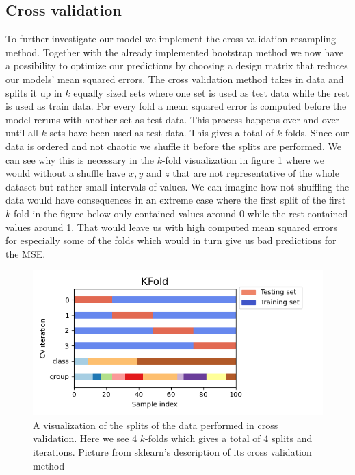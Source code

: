 \documentclass[12pt]{article}
\begin{document}
\subsection{Cross validation}
To further investigate our model we implement the cross validation resampling method. Together with the already implemented bootstrap method we now have a possibility to optimize our predictions by choosing a design matrix that reduces our models' mean squared errors. The cross validation method takes in data and splits it up in $k$ equally sized sets where one set is used as test data while the rest is used as train data. For every fold a mean squared error is computed before the model reruns with another set as test data. This process happens over and over until all $k$ sets have been used as test data. This gives a total of $k$ folds. Since our data is ordered and not chaotic we shuffle it before the splits are performed. We can see why this is necessary in the $k$-fold visualization in figure \ref{fig:k_fold} where we would without a shuffle have $x,y$ and $z$ that are not representative of the whole dataset but rather small intervals of values. We can imagine how not shuffling the data would have consequences in an extreme case where the first split of the first $k$-fold in the figure below only contained values around 0 while the rest contained values around 1. That would leave us with high computed mean squared errors for especially some of the folds which would in turn give us bad predictions for the MSE.
\begin{figure}[H]
  \centering
  \includegraphics[width=.7\textwidth]{../figures/cv_kfold.png}
  \caption{A visualization of the splits of the data performed in cross validation. Here we see 4 $k$-folds which gives a total of 4 splits and iterations. Picture from sklearn's description of its cross validation method \cite{cv}}
  \label{fig:k_fold}
\end{figure}
\end{document}
